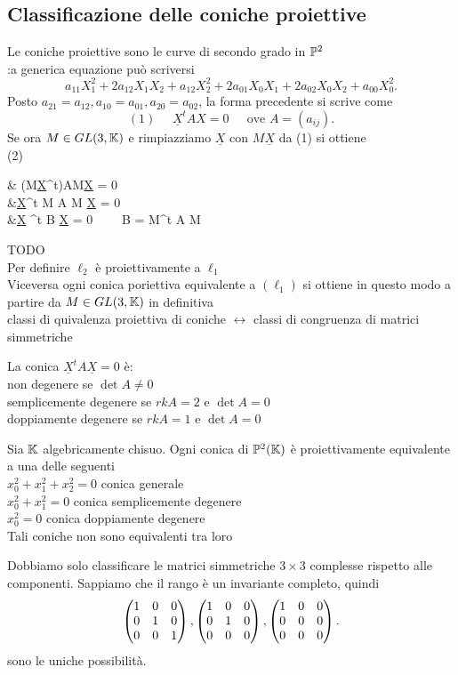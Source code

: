 \documentclass[12px]{article}
\begin{document}
	\subsection{Classificazione delle coniche proiettive}
	Le coniche proiettive sono le curve di secondo grado in $\mathbb{P}^2$\\
	:a generica equazione può scriversi 
	 \[
		 a_{11}X_1^2+2a_{12}X_1X_2+a_{12}X_2^2+2a_{01}X_0X_1+2a_{02}X_0X_2+a_{00}X_0^2
	.\] 
	Posto $a_{21}=a_{12}, a_{10}=a_{01},a_{20}=a_{02}$, la forma precedente si scrive come 
	\[
		(1)\ \ \ \ \ \ 	\underline X^t A X = 0 \ \ \ \ \ \text{ ove } A = (a_{ij})
	.\] 
	Se ora $M\in GL(3,\mathbb{K})$ e rimpiazziamo $\underline X$ con $M\underline X$ da (1) si ottiene \\
	(2)\begin{aligend}
	&	(M\underline X^t)AM\underline X = 0\\
	&\underline X^t M A M \underline X =  0\\
	&\underline X ^t B \underline X = 0 \ \ \ \ B = M^t A M
	\end{aligend} TODO \\
	Per definire $\ell_2$ è proiettivamente a $\ell_1$ \\
	Viceversa ogni conica poriettiva equivalente a $(\ell_1)$ si ottiene in questo modo a partire da $M\in GL(3,\mathbb{K})$ in definitiva\\
	classi di quivalenza proiettiva di coniche $\leftrightarrow $ classi di congruenza di matrici simmetriche 
	\begin{defi}
		La conica  $\underline X^tA\underline X = 0$ è:\\
		non degenere se  $\det A \neq 0$\\
		semplicemente degenere se  $rk A = 2$ e $\det A =0$\\
		doppiamente degenere se  $rk A  = 1$ e $\det A = 0$
	\end{defi}
	\begin{teo}
		Sia $\mathbb{K}$ algebricamente chisuo. Ogni conica di $\mathbb{P}^2(\mathbb{K})$ è proiettivamente equivalente a una delle seguenti\\
		$x_0^2+x_1^2+x_2^2 =0$ conica generale\\
		$x_0^2 +x_1^2 = 0$ conica semplicemente degenere\\
		$x_0^2=0$ conica doppiamente degenere\\
		Tali coniche non sono equivalenti tra loro
	\end{teo}
	\begin{dimo}
		Dobbiamo solo classificare le matrici simmetriche $3\times 3$ complesse rispetto alle componenti. Sappiamo che il rango è un invariante completo, quindi
		\[
			\begin{pmatrix}1&0&0\\0&1&0\\0&0&1\end{pmatrix},\begin{pmatrix}1&0&0\\0&1&0\\0&0&0\end{pmatrix},\begin{pmatrix}1&0&0\\0&0&0\\0&0&0\end{pmatrix}
		.\] 
		sono le uniche possibilità.\\
	\end{dimo}
\end{document}
